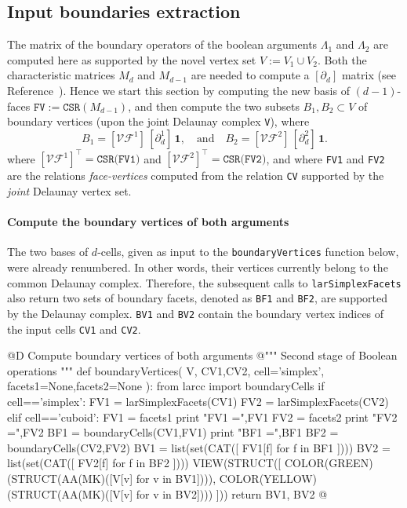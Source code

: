 \documentclass[11pt,oneside]{article}	%
\begin{document}
\subsection{Input boundaries extraction}

The matrix of the boundary operators of the boolean arguments $\Lambda_1$ and $\Lambda_2$ are computed here as supported by the novel vertex set $V := V_1 \cup V_2$. Both the characteristic matrices $M_d$ and $M_{d-1}$ are needed to compute a $[\partial_d]$ matrix (see Reference~\cite{Dicarlo:2014:TNL:2543138.2543294}). Hence we start this section by computing the new basis of $(d-1)$-faces $\texttt{FV} := \texttt{CSR}(M_{d-1})$, and then compute the two subsets $B_1,B_2 \subset V$ of boundary vertices (upon the joint Delaunay complex \texttt{V}), where
\[
B_1 = [\mathcal{VF}^1]\, [\partial_d^1]\,\mathbf{1},
\quad\mbox{and}\quad
B_2 = [\mathcal{VF}^2]\, [\partial_d^2]\,\mathbf{1}.
\]
where $[\mathcal{VF}^1]^\top = \texttt{CSR(FV1)}$ and $[\mathcal{VF}^2]^\top = \texttt{CSR(FV2)}$,
and where \texttt{FV1} and \texttt{FV2} are the relations \emph{face-vertices} computed from the relation \texttt{CV} supported by the \emph{joint} Delaunay vertex set. 

\paragraph{Compute the boundary vertices of both arguments}
The two bases of $d$-cells, given as input to the \texttt{boundaryVertices} function below, were already renumbered. In other words, their vertices currently belong to the common Delaunay complex. Therefore, the subsequent calls to \texttt{larSimplexFacets} also return two sets of boundary facets, denoted as \texttt{BF1} and \texttt{BF2}, are supported by the Delaunay complex. \texttt{BV1} and \texttt{BV2} contain the boundary vertex indices of the input cells \texttt{CV1} and \texttt{CV2}.

@D Compute boundary vertices of both arguments
@{""" Second stage of Boolean operations """
def boundaryVertices( V, CV1,CV2, cell='simplex', facets1=None,facets2=None ):
	from larcc import boundaryCells
	if cell=='simplex': 
		FV1 = larSimplexFacets(CV1)
		FV2 = larSimplexFacets(CV2)
	elif cell=='cuboid': 
		FV1 = facets1
		print "\n FV1 =",FV1
		FV2 = facets2
		print "\n FV2 =",FV2
	BF1 = boundaryCells(CV1,FV1)
	print "\n BF1 =",BF1
	BF2 = boundaryCells(CV2,FV2)
	BV1 = list(set(CAT([ FV1[f] for f in BF1 ])))
	BV2 = list(set(CAT([ FV2[f] for f in BF2 ])))
	VIEW(STRUCT([ 
		COLOR(GREEN)(STRUCT(AA(MK)([V[v] for v in BV1]))), 
		COLOR(YELLOW)(STRUCT(AA(MK)([V[v] for v in BV2]))) ]))
	return BV1, BV2
@}
\end{document}
